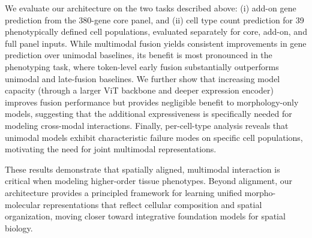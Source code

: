 We evaluate our architecture on the two tasks described above: (i) add-on gene prediction from the 380-gene core panel, and (ii) cell type count prediction for 39 phenotypically defined cell populations, evaluated separately for core, add-on, and full panel inputs. While multimodal fusion yields consistent improvements in gene prediction over unimodal baselines, its benefit is most pronounced in the phenotyping task, where token-level early fusion substantially outperforms unimodal and late-fusion baselines. We further show that increasing model capacity (through a larger ViT backbone and deeper expression encoder) improves fusion performance but provides negligible benefit to morphology-only models, suggesting that the additional expressiveness is specifically needed for modeling cross-modal interactions. Finally, per-cell-type analysis reveals that unimodal models exhibit characteristic failure modes on specific cell populations, motivating the need for joint multimodal representations.

These results demonstrate that spatially aligned, multimodal interaction is critical when modeling higher-order tissue phenotypes. Beyond alignment, our architecture provides a principled framework for learning unified morpho-molecular representations that reflect cellular composition and spatial organization, moving closer toward integrative foundation models for spatial biology.
